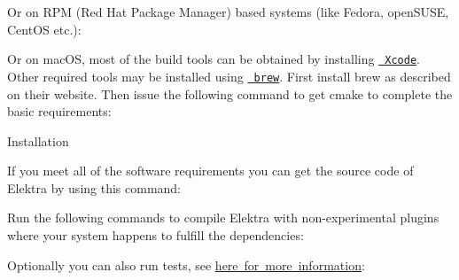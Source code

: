 Or on RPM (Red Hat Package Manager) based systems (like Fedora, open\+SUSE, Cent\+OS etc.)\+:


\begin{DoxyCode}{0}

\end{DoxyCode}


Or on mac\+OS, most of the build tools can be obtained by installing \href{https://developer.apple.com/xcode/}{\texttt{ Xcode}}. Other required tools may be installed using \href{https://brew.sh/}{\texttt{ brew}}. First install brew as described on their website. Then issue the following command to get cmake to complete the basic requirements\+:


\begin{DoxyCode}{0}

\end{DoxyCode}



\begin{DoxyItemize}
\item Installation

If you meet all of the software requirements you can get the source code of Elektra by using this command\+:
\end{DoxyItemize}


\begin{DoxyCode}{0}

\end{DoxyCode}


Run the following commands to compile Elektra with non-\/experimental plugins where your system happens to fulfill the dependencies\+:


\begin{DoxyCode}{0}

\end{DoxyCode}


Optionally you can also run tests, see \mbox{\hyperlink{doc_TESTING_md}{here for more information}}\+:


